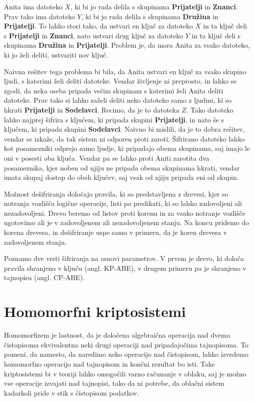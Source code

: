 \documentclass[12pt,a4paper,openany,tikz]{book}
\theoremstyle{plain}
\theoremstyle{definition}
\begin{document}
Anita ima datoteko $X$, ki bi jo rada delila s skupinama \textbf{Prijatelji} in \textbf{Znanci}. Prav tako ima datoteko $Y$, ki bi jo rada delila s skupinama \textbf{Družina} in \textbf{Prijatelji}. To lahko stori tako, da ustvari en ključ za datoteko $X$ in ta ključ deli s \textbf{Prijatelji} in  \textbf{Znanci}, nato ustvari drug ključ za datoteko $Y$ in ta ključ deli s skupinama \textbf{Družina} in \textbf{Prijatelji}. Problem je, da mora Anita za vsako datoteko, ki jo želi deliti, ustvariti nov ključ.

Naivna rešitev tega problema bi bila, da Anita ustvari en ključ za vsako skupino ljudi, s katerimi želi deliti datoteke. Vendar življenje ni preprosto, in lahko se zgodi, da neka oseba pripada večim skupinam s katerimi želi Anita deliti datoteke. Prav tako si lahko zaželi deliti neko datoteko samo z ljudmi, ki so hkrati \textbf{Prijatelji} in \textbf{Sodelavci}. Recimo, da je to datoteka $Z$. Tako datoteko lahko najprej šifrira s ključem, ki pripada skupini \textbf{Prijatelji}, in nato še s ključem, ki pripada skupini \textbf{Sodelavci}. Naivno bi mislili, da je to dobra rešitev, vendar se izkaže, da tak sistem ni odporen proti zaroti. Šifrirano datoteko lahko kot posamezniki odprejo samo ljudje, ki pripadajo obema skupinama, saj imajo le oni v posesti oba ključa. Vendar pa se lahko proti Aniti zarotita dva posameznika, kjer noben od njiju ne pripada obema skupinama hkrati, vendar imata skupaj dostop do obeh ključev, saj vsak od njiju pripada eni od skupin.

Možnost dešifriranja določajo pravila, ki so predstavljena z drevesi, kjer so notranja vozlišča logične operacije, listi pa predikati, ki so lahko zadovoljeni ali nezadovoljeni. Drevo beremo od listov proti korenu in za vsako notranje vozlišče ugotovimo ali je v zadovoljenem ali nezadovoljenem stanju. Na koncu pridemo do korena drevesa, in dešifriranje uspe samo v primeru, da je koren drevesa v zadovoljenem stanju.

Poznamo dve vrsti šifriranja na osnovi parametrov. V prvem je drevo, ki določa pravila shranjeno v ključu  (angl. \acrlong{KP-ABE}), v drugem primeru pa je shranjeno v tajnopisu (angl. \acrlong{CP-ABE}).

\section{Homomorfni kriptosistemi}
\label{sec:Homomorfni kriptosistemi}

Homomorfizem je lastnost, da je določena algebraična operacija nad dvema čistopisoma ekvivalentna neki drugi operaciji nad pripadajočima tajnopisoma. To pomeni, da namesto, da naredimo neko operacijo nad čistopisom, lahko izvedemo homomorfno operacijo nad tajnopisom in končni rezultat bo isti. Take kriptosistemi bi v teoriji lahko omogočili varno računanje v oblaku, saj je možno vse operacije izvajati nad tajnopisi, tako da ni potrebe, da oblačni sistem kadarkoli pride v stik s čistopisom podatkov.
\end{document}
